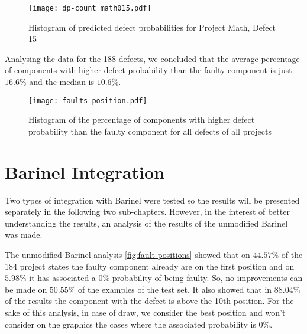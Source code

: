 
\begin{figure}[h]
  \begin{center}
    \leavevmode
    \texttt{[image: dp-count\_math015.pdf]}
    \caption{Histogram of predicted defect probabilities for Project Math, Defect 15}
    \label{fig:dp-count_math015}
  \end{center}
\end{figure}

Analysing the data for the 188 defects, we concluded that the average percentage of components with higher defect probability than the faulty component is just $16.6\%$ and the median is $10.6\%$.


\begin{figure}[h]
  \begin{center}
    \leavevmode
    \texttt{[image: faults-position.pdf]}
    \caption{Histogram of the percentage of components with higher defect probability than the faulty component for all defects of all projects}
    \label{fig:dp-faults-position}
  \end{center}
\end{figure}



\section{Barinel Integration}


Two types of integration with Barinel were tested so the results will be presented separately in the following two sub-chapters. However, in the interest of better understanding the results, an analysis of the results of the unmodified Barinel was made.

The unmodified Barinel analysis \ref{fig:fault-positions} showed that on $44.57\%$ of the 184 project states the faulty component already are on the first position and on $5.98\%$ it has associated a $0\%$ probability of being faulty. So, no improvements can be made on $50.55\%$ of the examples of the test set. It also showed that in $88.04\%$ of the results the component with the defect is above the 10th position. For the sake of this analysis, in case of draw, we consider the best position and won't consider on the graphics the cases where the associated probability is $0\%$.

